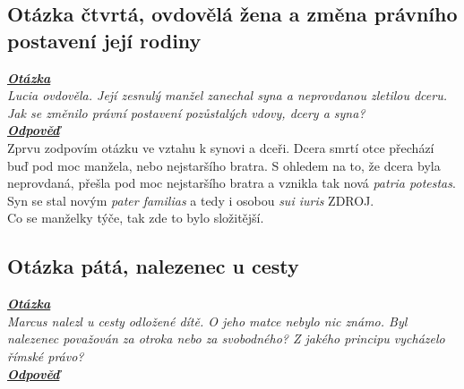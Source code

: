 \documentclass{article}
\begin{document}


\subsection{Otázka čtvrtá, ovdovělá žena a změna právního postavení její rodiny}
\textbf{\textit{\underline{Otázka}}}\\

\textit{Lucia ovdověla. Její zesnulý manžel zanechal syna a neprovdanou zletilou dceru. Jak se změnilo právní postavení pozůstalých vdovy, dcery a syna?}\\

\noindent\textbf{\textit{\underline{Odpověď}}}\\


Zprvu zodpovím otázku ve vztahu k synovi a dceři. Dcera smrtí otce přechází buď pod moc manžela, nebo nejstaršího bratra. S ohledem na to, že dcera byla neprovdaná, přešla pod moc nejstaršího bratra a vznikla tak nová \textit{patria potestas}. Syn se stal novým \textit{pater familias} a tedy i osobou \textit{sui iuris} ZDROJ.\\

Co se manželky týče, tak zde to bylo složitější.

\subsection{Otázka pátá, nalezenec u cesty}
\textbf{\textit{\underline{Otázka}}}\\
\textit{Marcus nalezl u cesty odložené dítě. O jeho matce nebylo nic známo. Byl nalezenec považován za otroka nebo za svobodného? Z jakého principu vycházelo římské právo?}\\

\noindent\noindent\textbf{\textit{\underline{Odpověď}}}\\

\end{document}
